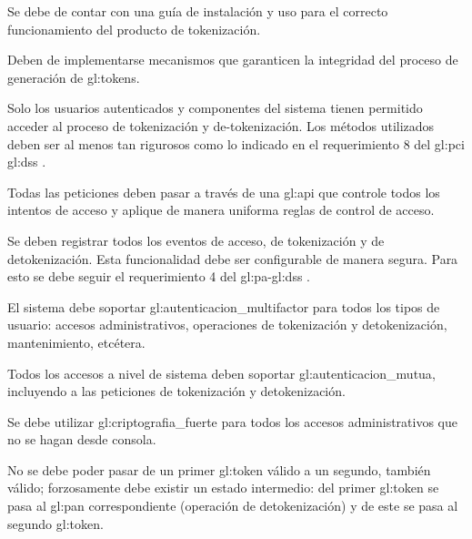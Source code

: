 {
  Se debe de contar con una guía de instalación y uso para el correcto
  funcionamiento del producto de tokenización.
}

{
  Deben de implementarse mecanismos que garanticen la integridad del proceso
  de generación de \glspl{gl:token}.
}

{
  Solo los usuarios autenticados y componentes del sistema tienen permitido
  acceder al proceso de tokenización y de-tokenización. Los métodos utilizados
  deben ser al menos tan rigurosos como lo indicado en el requerimiento 8 del
  \gls{gl:pci} \gls{gl:dss} \cite{pci_dss}.

  {
    Todas las peticiones deben pasar a través de una \gls{gl:api} que controle
    todos los intentos de acceso y aplique de manera uniforma reglas de
    control de acceso.
  }

  {
    Se deben registrar todos los eventos de acceso, de tokenización y
    de detokenización. Esta funcionalidad debe ser configurable de manera
    segura. Para esto se debe seguir el requerimiento 4 del
    \gls{gl:pa}-\gls{gl:dss} \cite{dss_pa}.
  }

  {
    El sistema debe soportar \gls{gl:autenticacion_multifactor} para todos
    los tipos de usuario: accesos administrativos, operaciones de tokenización
    y detokenización, mantenimiento, etcétera.
  }

  {
    Todos los accesos a nivel de sistema deben soportar
    \gls{gl:autenticacion_mutua}, incluyendo a las peticiones de tokenización
    y detokenización.
  }

  {
    Se debe utilizar \gls{gl:criptografia_fuerte} para todos los accesos
    administrativos que no se hagan desde consola.
  }
}

{
  No se debe poder pasar de un primer \gls{gl:token} válido a un segundo,
  también válido; forzosamente debe existir un estado intermedio: del primer
  \gls{gl:token} se pasa al \gls{gl:pan} correspondiente (operación de
  detokenización) y de este se pasa al segundo \gls{gl:token}.
}

